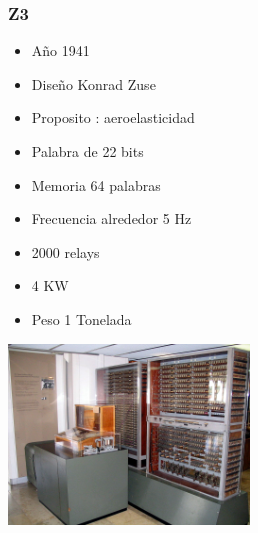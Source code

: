 \documentclass{beamer}
\begin{document}
\begin{frame}
\frametitle{Z3}
\begin{minipage}[c]{5.25cm}
	\begin{itemize}
		\item Año 1941
		\item Diseño Konrad Zuse
		\item Proposito : aeroelasticidad
		\item Palabra de 22 bits
		\item Memoria 64 palabras
		\item Frecuencia alrededor 5 Hz
		\item 2000 relays
		\item 4 KW
		\item Peso 1 Tonelada
	\end{itemize}
\end{minipage}
	\begin{minipage}[c]{6.4cm}
		\includegraphics[width=6.4cm]{Z3_Deutsches_Museum.JPG}
	\end{minipage}
\end{frame}
\end{document}
